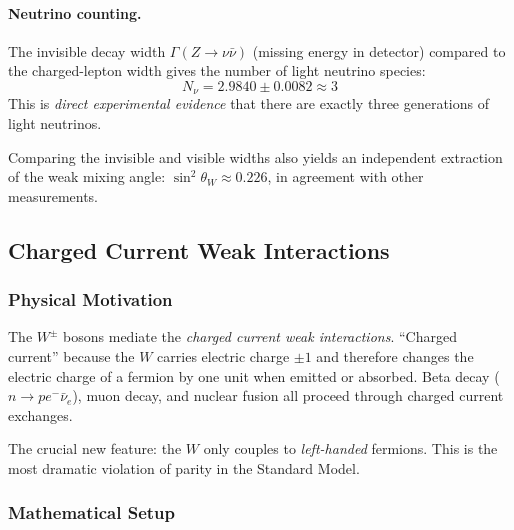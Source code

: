 \paragraph{Neutrino counting.}
The invisible decay width $\Gamma(Z\to\nu\bar\nu)$ (missing energy in
detector) compared to the charged-lepton width gives the number of
light neutrino species:
\begin{equation}
  \boxed{N_\nu = 2.9840\pm0.0082 \approx 3}
  \label{eq:lec19:neutrino-count}
\end{equation}
This is \emph{direct experimental evidence} that there are exactly
three generations of light neutrinos.

Comparing the invisible and visible widths also yields an independent
extraction of the weak mixing angle: $\sin^2\!\theta_W\approx0.226$,
in agreement with other measurements.

\subsection{Charged Current Weak Interactions}\label{subsec:lec19:cc}

\subsubsection*{Physical Motivation}

The $W^\pm$ bosons mediate the \emph{charged current weak interactions}.
``Charged current'' because the $W$ carries electric charge $\pm1$ and
therefore changes the electric charge of a fermion by one unit when
emitted or absorbed. Beta decay ($n\to p e^-\bar\nu_e$), muon decay, and
nuclear fusion all proceed through charged current exchanges.

The crucial new feature: the $W$ only couples to \emph{left-handed}
fermions. This is the most dramatic violation of parity in the Standard
Model.

\subsubsection*{Mathematical Setup}


